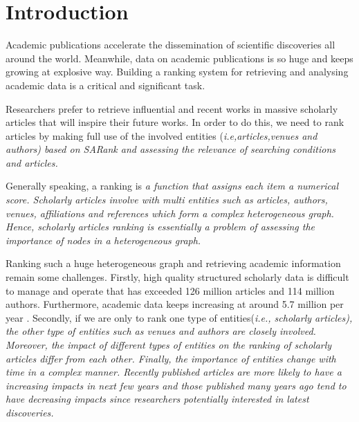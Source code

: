 \section{Introduction}
\label{sec-intro}



Academic publications accelerate the dissemination of scientific discoveries all around the world. Meanwhile, data on academic publications is so huge and keeps growing at explosive way. Building a ranking system for retrieving and analysing academic data is a critical and significant task.




Researchers prefer to retrieve influential and recent works in massive scholarly articles that will inspire their future works. In order to do this, we need to rank articles by making full use of the involved entities (\itshape i.e,\upshape articles,venues and authors) based on SARank \cite{ma2018query} and assessing the relevance of searching conditions and articles.


Generally speaking, a ranking is \itshape a function that assigns each item a numerical score. \upshape Scholarly articles involve with multi entities such as articles, authors, venues, affiliations and references which form a complex heterogeneous graph. Hence, scholarly articles ranking is essentially a problem of assessing the importance of nodes in a heterogeneous graph.


Ranking such a huge heterogeneous graph and retrieving academic information remain some challenges. Firstly, high quality structured scholarly data is difficult to manage and operate that has exceeded 126 million articles and 114 million authors. Furthermore, academic data keeps increasing at around 5.7 million per year \cite{sinha2015overview}. Secondly, if we are only to rank one type of entities(\itshape i.e., \upshape scholarly articles), the other type of entities such as venues and authors are closely involved. Moreover, the impact of different types of entities on the ranking of scholarly articles differ from each other. Finally, the importance of entities change with time in a complex manner. Recently published articles are more likely to have a increasing impacts in next few years and those published many years ago tend to have decreasing impacts since researchers potentially interested in latest discoveries.

